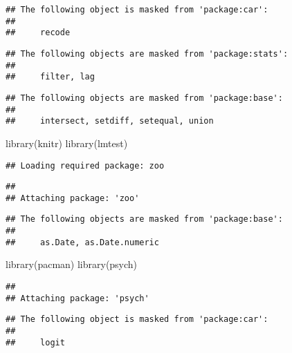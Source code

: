 \documentclass[
]{article}
\newenvironment{Shaded}{\begin{snugshade}}{\end{snugshade}}
\newcommand{\FunctionTok}[1]{\textcolor[rgb]{0.00,0.00,0.00}{#1}}
\newcommand{\NormalTok}[1]{#1}
\begin{document}
\begin{verbatim}
## The following object is masked from 'package:car':
## 
##     recode
\end{verbatim}

\begin{verbatim}
## The following objects are masked from 'package:stats':
## 
##     filter, lag
\end{verbatim}

\begin{verbatim}
## The following objects are masked from 'package:base':
## 
##     intersect, setdiff, setequal, union
\end{verbatim}

\begin{Shaded}
\begin{Highlighting}[]
\FunctionTok{library}\NormalTok{(knitr)                                                                           }
\FunctionTok{library}\NormalTok{(lmtest)                                                                          }
\end{Highlighting}
\end{Shaded}

\begin{verbatim}
## Loading required package: zoo
\end{verbatim}

\begin{verbatim}
## 
## Attaching package: 'zoo'
\end{verbatim}

\begin{verbatim}
## The following objects are masked from 'package:base':
## 
##     as.Date, as.Date.numeric
\end{verbatim}

\begin{Shaded}
\begin{Highlighting}[]
\FunctionTok{library}\NormalTok{(pacman)                                                                          }
\FunctionTok{library}\NormalTok{(psych)                                                                           }
\end{Highlighting}
\end{Shaded}

\begin{verbatim}
## 
## Attaching package: 'psych'
\end{verbatim}

\begin{verbatim}
## The following object is masked from 'package:car':
## 
##     logit
\end{verbatim}
\end{document}
